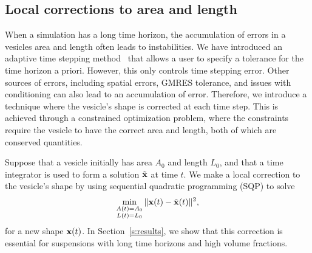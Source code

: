 %
%
%


\subsection{Local corrections to area and length}
\label{s:localCorrect}
When a simulation has a long time horizon, the accumulation of errors in
a vesicles area and length often leads to instabilities.  We have
introduced an adaptive time stepping method~\cite{qua:bir2014b} that
allows a user to specify a tolerance for the time horizon a priori.
However, this only controls time stepping error.  Other sources of
errors, including spatial errors, GMRES tolerance, and issues with
conditioning can also lead to an accumulation of error.  Therefore, we
introduce a technique where the vesicle's shape is corrected at each
time step.  This is achieved through a constrained optimization problem,
where the constraints require the vesicle to have the correct area and
length, both of which are conserved quantities.  

Suppose that a vesicle initially has area $A_{0}$ and length $L_{0}$,
and that a time integrator is used to form a solution $\tilde{{\mathbf{x}}}$ at
time $t$.  We make a local correction to the vesicle's shape by using
sequential quadratic programming (SQP) to solve
\begin{align*}
  \min_{\substack{A(t) = A_{0} \\ L(t) = L_{0}}} 
    \|{\mathbf{x}}(t) - \tilde{{\mathbf{x}}}(t)\|^{2},
\end{align*}
for a new shape ${\mathbf{x}}(t)$.  In Section~\ref{s:results}, we show that this
correction is essential for suspensions with long time horizons and high
volume fractions.


